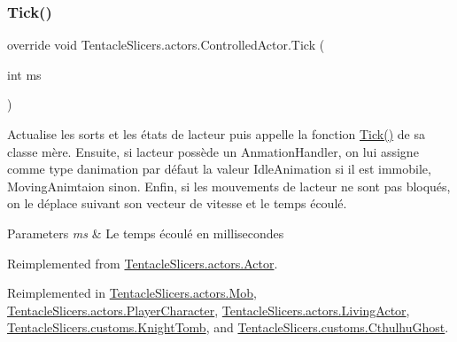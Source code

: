 \subsubsection{\texorpdfstring{Tick()}{Tick()}}
{\footnotesize\ttfamily override void Tentacle\+Slicers.\+actors.\+Controlled\+Actor.\+Tick (\begin{DoxyParamCaption}\item[{int}]{ms }\end{DoxyParamCaption})\hspace{0.3cm}{\ttfamily [virtual]}}



Actualise les sorts et les états de l\textquotesingle{}acteur puis appelle la fonction \hyperlink{class_tentacle_slicers_1_1actors_1_1_controlled_actor_aa66cbbda81610ee2610e540e59725a39}{Tick()} de sa classe mère. Ensuite, si l\textquotesingle{}acteur possède un Anmation\+Handler, on lui assigne comme type d\textquotesingle{}animation par défaut la valeur Idle\+Animation si il est immobile, Moving\+Animtaion sinon. Enfin, si les mouvements de l\textquotesingle{}acteur ne sont pas bloqués, on le déplace suivant son vecteur de vitesse et le temps écoulé. 


\begin{DoxyParams}{Parameters}
{\em ms} & Le temps écoulé en millisecondes \\
\hline
\end{DoxyParams}


Reimplemented from \hyperlink{class_tentacle_slicers_1_1actors_1_1_actor_a13e48a1ca022ce7c971c77f1354e3daf}{Tentacle\+Slicers.\+actors.\+Actor}.



Reimplemented in \hyperlink{class_tentacle_slicers_1_1actors_1_1_mob_ad3e79cfdf2a28f8eb6363f0567bdcaaf}{Tentacle\+Slicers.\+actors.\+Mob}, \hyperlink{class_tentacle_slicers_1_1actors_1_1_player_character_ae5043ba6bbb1d2007f0f29f61e28369c}{Tentacle\+Slicers.\+actors.\+Player\+Character}, \hyperlink{class_tentacle_slicers_1_1actors_1_1_living_actor_a1697e3d67782b4df99e48a333a138935}{Tentacle\+Slicers.\+actors.\+Living\+Actor}, \hyperlink{class_tentacle_slicers_1_1customs_1_1_knight_tomb_a2494934e67c63f70623b7ff47a4248f8}{Tentacle\+Slicers.\+customs.\+Knight\+Tomb}, and \hyperlink{class_tentacle_slicers_1_1customs_1_1_cthulhu_ghost_a402aea79e343f8f5a1b153a143edf9fb}{Tentacle\+Slicers.\+customs.\+Cthulhu\+Ghost}.

\mbox{\label{class_tentacle_slicers_1_1actors_1_1_controlled_actor_a046c8e6ce7e9d5a2cf7520939cba40a0}} 
